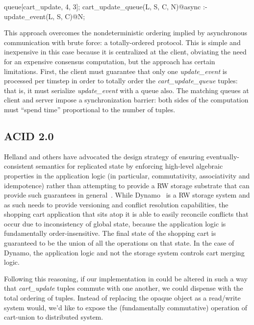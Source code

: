 \begin{Dedalus}
queue[cart_update, 4, 3];
cart_update_queue(L, S, C, N)@async :- 
    update_event(L, S, C)@N;
\end{Dedalus}

This approach overcomes the nondeterministic ordering implied by asynchronous 
communication with brute force: a totally-ordered protocol.  This is simple and inexpensive 
in this case because it is centralized at the client, obviating the need for an expensive consensus computation, but the approach has certain limitations.  First, the client
must guarantee that only one {\em update\_event} is processed per timstep in order to totally
order the {\em cart\_update\_queue} tuples: that is, it must serialize {\em update\_event} with
a queue also.  The matching queues at client and server impose a synchronization barrier: both sides of the computation must ``spend time'' proportional to the number of tuples.

\subsection{ACID 2.0}

Helland and others have advocated the design strategy of ensuring eventually-consistent 
semantics for replicated state by enforcing high-level algebraic 
properties in the application logic (in particular, commutativity, associativity and 
idempotence) rather than attempting to provide a RW storage substrate that can provide
such guarantees in general~\cite{quicksand, beyond}.  While Dynamo~\cite{dynamo} 
is a RW storage system
and as such needs to provide versioning and conflict resolution capabilities, the shopping
cart application that sits atop it is able to easily reconcile conflicts that occur due to inconsistency of global state, because the application logic is fundamentally order-insensitive.
The final state of the shopping cart is guaranteed to be the union of all the operations on
that state.  In the case of Dynamo, the application logic and not the storage system controls
cart merging logic.

Following this reasoning, if our implementation in \lang could be altered in such a way that
{\em cart\_update} tuples commute with one another,  we could dispense with the total
ordering of tuples.  Instead of replacing the opaque object as a read/write system would,
we'd like to expose the (fundamentally commutative) operation of cart-union to distributed
system.

